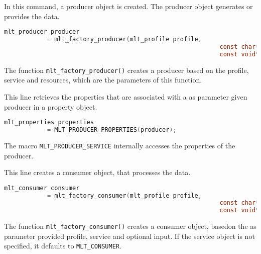 \documentclass[../MasterThesis.tex]{subfiles}
\begin{document}
\begin{description}[font=\normalfont\color{RedViolet!80!black}, style=nextline]
	In this command, a producer object is created. The producer object generates or provides the data.

	\begin{lstlisting}[language=C, numbers=none, basicstyle=\footnotesize\ttfamily, belowskip=0pt, aboveskip=9pt]
	mlt_producer producer 
			= mlt_factory_producer(mlt_profile profile,
															const char* service,
															const void* resource); \end{lstlisting}
																						  
	The function \texttt{mlt\_factory\_producer()} creates a producer based on the profile, service and resources, which are the parameters of this function.


	
	
	\item[Create properties] 
	
	This line retrieves the properties that are associated with a as parameter given producer in a property object.
	
	\begin{lstlisting}[language=C, numbers=none, basicstyle=\footnotesize\ttfamily, belowskip=0pt, aboveskip=9pt]
	mlt_properties properties 
			= MLT_PRODUCER_PROPERTIES(producer); \end{lstlisting}
	
	The macro \texttt{MLT\_PRODUCER\_SERVICE} internally accesses the properties of the producer.
	
	
	
	\item[Create a consumer] 
	
	This line creates a consumer object, that processes the data.
	
	\begin{lstlisting}[language=C, numbers=none, basicstyle=\footnotesize\ttfamily, belowskip=0pt, aboveskip=9pt]
	mlt_consumer consumer 
			= mlt_factory_consumer(mlt_profile profile, 
															const char* service, 
															const void* input); \end{lstlisting}
																
	The function \texttt{mlt\_factory\_consumer()} creates a consumer object, basedon the as parameter provided profile, service and optional input. If the service object is not specified, it defaults to \texttt{MLT\_CONSUMER}.
											
																
	

\end{description}
\end{document}
